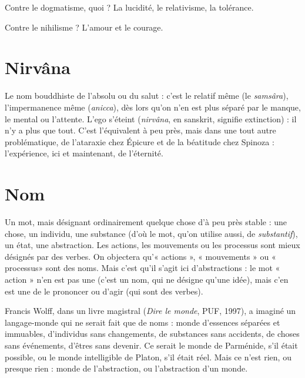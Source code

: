 Contre le dogmatisme, quoi ? La lucidité, le relativisme, la tolérance.

Contre le nihilisme ? L’amour et le courage.

\section{Nirvâna}
Le nom bouddhiste de l’absolu ou du salut : c’est le relatif même
(le {\it samsâra}), l'impermanence même ({\it anicca}), dès lors qu’on n’en
est plus séparé par le manque, le mental ou l'attente. L’ego s'éteint ({\it nirvâna}, en
sanskrit, signifie extinction) : il n’y a plus que tout. C’est l'équivalent à peu
près, mais dans une tout autre problématique, de l’ataraxie chez Épicure et de
la béatitude chez Spinoza : l'expérience, ici et maintenant, de l’éternité.

\section{Nom}
Un mot, mais désignant ordinairement quelque chose d’à peu près
stable : une chose, un individu, une substance (d’où le mot, qu’on utilise
aussi, de {\it substantif}), un état, une abstraction. Les actions, les mouvements
ou les processus sont mieux désignés par des verbes. On objectera qu’« actions »,
« mouvements » ou « processus» sont des noms. Mais c’est qu'il s’agit ici
d’abstractions : le mot « action » n’en est pas une (c’est un nom, qui ne désigne
qu’une idée), mais c’en est une de le prononcer ou d’agir (qui sont des verbes).

Francis Wolff, dans un livre magistral ({\it Dire le monde}, PUF, 1997), a imaginé
un langage-monde qui ne serait fait que de noms : monde d’essences séparées et
immuables, d'individus sans changements, de substances sans accidents, de
choses sans événements, d’êtres sans devenir. Ce serait le monde de Parménide,
s’il était possible, ou le monde intelligible de Platon, s’il était réel. Mais ce n’est
rien, ou presque rien : monde de l’abstraction, ou l’abstraction d’un monde.

